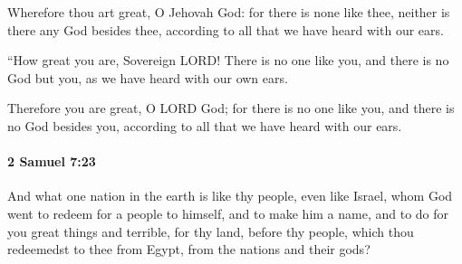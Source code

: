 			\begin{versebox}
					\item[BHS] 
					\item[ASV] Wherefore thou art great, O Jehovah God: for there is none like thee, neither is there any God besides thee, according to all that we have heard with our ears.
					\item[NIV] “How great you are, Sovereign LORD! There is no one like you, and there is no God but you, as we have heard with our own ears.
					\item[NRSV] Therefore you are great, O LORD God; for there is no one like you, and there is no God besides you, according to all that we have heard with our ears.
			\end{versebox}

		\paragraph{2 Samuel 7:23} %
			\label{2SAMUEL-7-23}

			And what one nation in the earth is like thy people, even like Israel, whom God went to redeem for a people to himself, and to make him a name, and to do for you great things and terrible, for thy land, before thy people, which thou redeemedst to thee from Egypt, from the nations and their gods?

